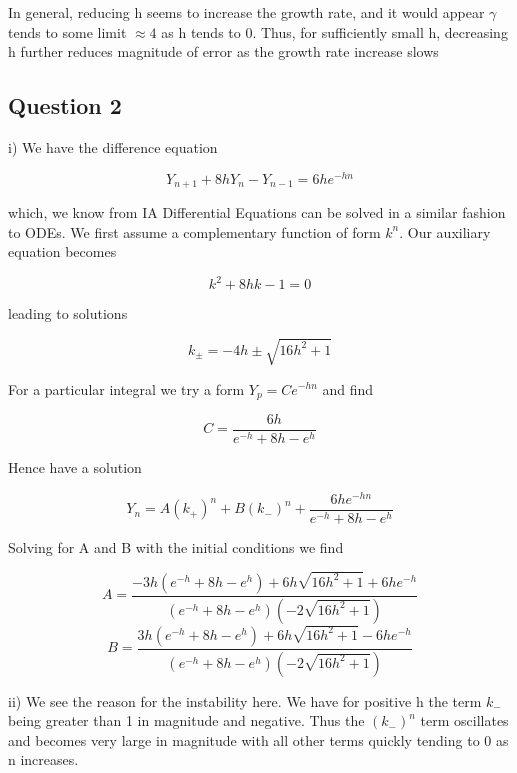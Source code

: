 \documentclass[10pt,a4paper]{report}
\begin{document}
In general, reducing h seems to increase the growth rate, and it would appear $\gamma$ tends to some limit $\approx 4$ as h tends to 0. Thus, for sufficiently small h, decreasing h further reduces magnitude of error as the growth rate increase slows



\subsection*{Question 2}

i) We have the difference equation

\begin{equation*}
Y_{n+1}+8hY_n-Y_{n-1}=6he^{-hn}
\end{equation*}

which, we know from IA Differential Equations can be solved in a similar fashion to ODEs. We first assume a complementary function of form $k^n$. Our auxiliary equation becomes

\begin{equation*}
k^2+8hk-1=0
\end{equation*}

leading to solutions 

\begin{equation*}
k_\pm=-4h\pm\sqrt{16h^2+1}
\end{equation*}

For a particular integral we try a form $Y_p=Ce^{-hn}$ and find

\begin{equation*}
C=\frac{6h}{e^{-h}+8h-e^h}
\end{equation*}

Hence have a solution

\begin{equation*}
Y_n=A(k_+)^n + B(k_-)^n +\frac{6he^{-hn}}{e^{-h}+8h-e^h}
\end{equation*}

Solving for A and B with the initial conditions we find

\begin{equation*}
A=\frac{-3h(e^{-h} + 8h - e^h)+6h\sqrt{16h^2+1}+6he^{-h}}{(e^{-h} + 8h - e^h)(-2\sqrt{16h^2+1})}
\end{equation*}
\begin{equation*}
B=\frac{3h(e^{-h} + 8h - e^h)+6h\sqrt{16h^2+1}-6he^{-h}}{(e^{-h} + 8h - e^h)(-2\sqrt{16h^2+1})}
\end{equation*}

ii) We see the reason for the instability here. We have for positive h the term $k_-$ being greater than 1 in magnitude and negative. Thus the $(k_-)^n$ term oscillates and becomes very large in magnitude with all other terms quickly tending to 0 as n increases.\\
\end{document}
